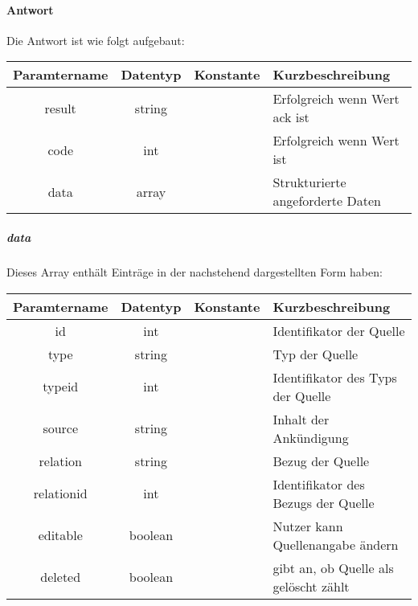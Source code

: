 \paragraph{Antwort}Die Antwort ist wie folgt aufgebaut:
\begin{table}[H]
	\begin{tabular}{|c|c|c|p{6.5cm}|}
		\hline
		\textbf{Paramtername} & \textbf{Datentyp} & \textbf{Konstante} & \textbf{Kurzbeschreibung}                                                                                               \\ \hline
		result              & string           &                 & Erfolgreich wenn Wert {\glqq ack\grqq} ist \\ \hline
		code                & int              &                 & Erfolgreich wenn Wert {\glqq 0\grqq} ist \\ \hline
		data                & array            &                 & Strukturierte angeforderte Daten \\ \hline
	\end{tabular}
\end{table}
\subparagraph{data}Dieses Array enthält Einträge in der nachstehend dargestellten Form haben:
\begin{table}[H]
	\begin{tabular}{|c|c|c|p{6.5cm}|}
		\hline
		\textbf{Paramtername} & \textbf{Datentyp} & \textbf{Konstante} & \textbf{Kurzbeschreibung}    \\ \hline
		id         & int               &                 & Identifikator der Quelle \\ \hline
		type       & string            &                 & Typ der Quelle \\ \hline
		typeid     & int               &                 & Identifikator des Typs der Quelle \\ \hline
		source     & string            &                 & Inhalt der Ankündigung \\ \hline
		relation   & string            &                 & Bezug der Quelle \\ \hline
		relationid & int               &                 & Identifikator des Bezugs der Quelle \\ \hline
		editable   & boolean           &                 & Nutzer kann Quellenangabe ändern \\ \hline
		deleted    & boolean           &                 & gibt an, ob Quelle als gelöscht zählt \\ \hline
	\end{tabular}
\end{table}
